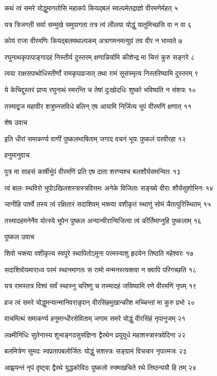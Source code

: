कथं त्वं समरे योद्धुमागतोसि महाकपे
कियद्बलं स्वल्पमेतद्राज्ञो वीरमणेर्महत् ५

यत्र त्रिजगती सर्वा सम्मुखे समुपागता
तत्र त्वं लीलया योद्धुं यातुमिच्छसि वा न वा ६

कोयं राजा वीरमणिः कियद्बलमथाल्पकम्
अत्रागमनमत्युग्रं तव वीर न भाव्यते ७

रघुनाथकृपापाङ्गादहं निस्तीर्य दुस्तरम्
क्षणान्निर्यामि कीशेन्द्र मा चित्तं कुरु सङ्गरे ८

त्वया राक्षसपाथोधिस्तीर्णो रामकृपाव्रजात्
तथा रामं सुसंस्मृत्य निस्तरिष्यामि दुस्तरम् ९

ये केचिद्दुस्तरं प्राप्य रघुनाथं स्मरन्ति च
तेषां दुःखोदधिः शुष्को भविष्यति न संशयः १०

तस्माद्व्रज महावीर शत्रुघ्नसविधे बलिन्
एष आयामि निर्जित्य भूपं वीरमणिं क्षणात् ११

शेष उवाच

इति धीरां समाकर्ण्य वाणीं पुष्कलभाषिताम्
जगाद वचनं भूयः पुष्कलं परवीरहा १२

हनुमानुवाच

पुत्र मा साहसं कार्षीर्भूपं वीरमणिं प्रति
एष दाता शरण्यश्च बलशौर्यसमन्वितः १३

त्वं बालः स्थविरो भूपोऽखिलशस्त्रास्त्रवित्तमः
अनेके विजिताः सङ्ख्ये वीराः शौर्यसुशोभिनः १४

जानीहि पार्श्वे तस्य त्वं रक्षितारं सदाशिवम्
भक्त्या वशीकृतं स्थाणुं सोमं चैतत्पुरिस्थितम् १५

तस्मादहमनेनैव योत्स्ये भूपेन पुष्कल
अन्यान्वीरान्विजित्वा त्वं कीर्तिमाप्नुहि पुष्कलाम् १६

पुष्कल उवाच

शिवो भक्त्या वशीकृत्य स्वपुरे स्थापितोऽमुना
परमस्याशु हृदयेन तिष्ठति महेश्वरः १७

सदाशिवोयमाराध्य परमं स्थानमागतः
स रामो मन्मनस्त्यक्त्वा न क्वापि परिगच्छति १८

यत्र रामस्तत्र विश्वं सर्वं स्थास्नु चरिष्णु च
तस्मादहं जयिष्यामि रणे वीरमणिं नृपम् १९

व्रज त्वं समरे योद्धुमन्यान्मानिवरान्नृपान्
वीरसिंहमुखान्कीश मच्चिन्तां मा कुरु प्रभो २०

वाचमित्थं समाकर्ण्य हनूमान्धीरसेविताम्
जगाम समरे योद्धुं वीरसिंहं नृपानुजम् २१

लक्ष्मीनिधिः सुतेनास्य शुभाङ्गदसुसंज्ञिना
द्वैरथेन प्रयुयुधे महाशस्त्रास्त्रवेदिना २२

बलमित्रेण सुमदः स्वप्रतापबलोर्जितः
योद्धुं सशस्त्रः सङ्ग्रामं विचचार नृपात्मजः २३

आह्वयन्तं नृपं दृष्ट्वा द्वैरथे युद्धकोविदः
पुष्कलो रुक्मखचिते रथे तिष्ठन्ययौ हि तम् २४

